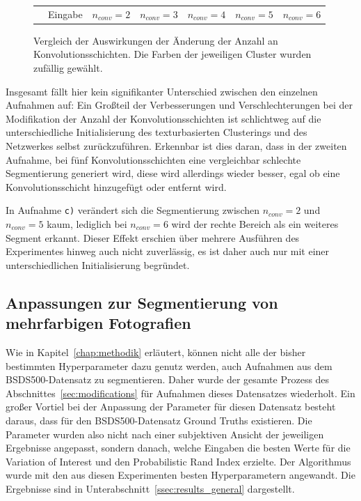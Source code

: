 \begin{figure}[h!]
\begin{tabular}{m{15pt}m{}m{}m{}m{}m{}m{}}
		&
		\vspace*{2pt}\centering Eingabe & 
		\vspace*{2pt}\centering $n_{conv}=2$ &
		\vspace*{2pt}\centering $n_{conv}=3$ &
		\vspace*{2pt}\centering $n_{conv}=4$ &
		\vspace*{2pt}\centering $n_{conv}=5$ &
		\vspace*{2pt}\centering $n_{conv}=6$ 
	\end{tabular}
	\caption{Vergleich der Auswirkungen der Änderung der Anzahl an Konvolutionsschichten. Die Farben der jeweiligen Cluster wurden zufällig gewählt.}
	\label{fig:n_layers_comparision}
\end{figure}

Insgesamt fällt hier kein signifikanter Unterschied zwischen den einzelnen Aufnahmen auf: Ein Großteil der Verbesserungen und Verschlechterungen bei der Modifikation der Anzahl der Konvolutionsschichten ist schlichtweg auf die unterschiedliche Initialisierung des texturbasierten Clusterings und des Netzwerkes selbst zurückzuführen. Erkennbar ist dies daran, dass in der zweiten Aufnahme, bei fünf Konvolutionsschichten eine vergleichbar schlechte Segmentierung generiert wird, diese wird allerdings wieder besser, egal ob eine Konvolutionsschicht hinzugefügt oder entfernt wird.

In Aufnahme \texttt{c)} verändert sich die Segmentierung zwischen $n_{conv}=2$ und $n_{conv}=5$ kaum, lediglich bei $n_{conv}=6$ wird der rechte Bereich als ein weiteres Segment erkannt. Dieser Effekt erschien über mehrere Ausführen des Experimentes hinweg auch nicht zuverlässig, es ist daher auch nur mit einer unterschiedlichen Initialisierung begründet.

\subsection{Anpassungen zur Segmentierung von mehrfarbigen Fotografien}
\label{ssec:exp_colorpicture_optimization}

Wie in Kapitel~\ref{chap:methodik} erläutert, können nicht alle der bisher bestimmten Hyperparameter dazu genutz werden, auch Aufnahmen aus dem BSDS500-Datensatz zu segmentieren. Daher wurde der gesamte Prozess des Abschnittes~\ref{sec:modifications} für Aufnahmen dieses Datensatzes wiederholt. Ein großer Vortiel bei der Anpassung der Parameter für diesen Datensatz besteht daraus, dass für den BSDS500-Datensatz Ground Truths existieren. Die Parameter wurden also nicht nach einer subjektiven Ansicht der jeweiligen Ergebnisse angepasst, sondern danach, welche Eingaben die besten Werte für die Variation of Interest und den Probabilistic Rand Index erzielte. Der Algorithmus wurde mit den aus diesen Experimenten besten Hyperparametern angewandt. Die Ergebnisse sind in Unterabschnitt~\ref{ssec:results_general} dargestellt.

